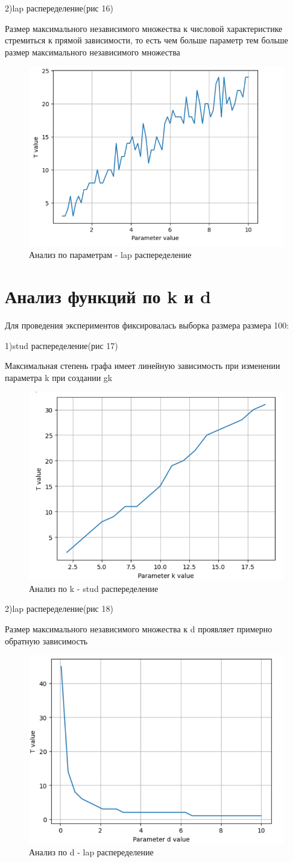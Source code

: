 \documentclass{HSEtitle}
\begin{document}
2)lap распеределение(рис 16)  

Размер максимального независимого множества к числовой характеристике стремиться к прямой зависимости, то есть чем больше параметр тем больше размер максимального независимого множества
\begin{figure}
    \centering
    \includegraphics[width=0.5\linewidth]{12.png}
    \caption{Анализ по параметрам - lap распеределение}
    \label{fig:enter-label}
\end{figure}



\section{Анализ функций по k и d}

Для проведения экспериментов фиксировалась выборка размера размера 100:

1)stud распеределение(рис 17) 

Максимальная степень графа имеет линейную зависимость при изменении параметра k при создании gk
\begin{figure}
    \centering
    \includegraphics[width=0.5\linewidth]{15.png}
    \caption{Анализ по k  - stud распеределение}
    \label{fig:enter-label}
\end{figure}

2)lap распеределение(рис 18) 

Размер максимального независимого множества к d проявляет примерно обратную зависимость
\begin{figure}
    \centering
    \includegraphics[width=0.5\linewidth]{17.png}
    \caption{Анализ по d - lap распеределение}
    \label{fig:enter-label}
\end{figure}
\end{document}
